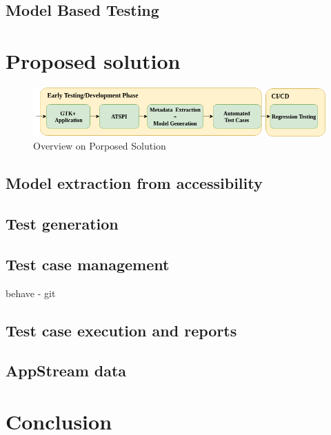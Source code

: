 \section{Model Based Testing}

\chapter{Proposed solution}

\begin{figure}[hbt]
	\centering
	\includegraphics[width=1\textwidth]{obrazky-figures/diagram.png}
	\caption{Overview on Porposed Solution}
	\label{Diagram}
\end{figure}

\section{Model extraction from accessibility}
\section{Test generation}
\section{Test case management}
behave - git
\section{Test case execution and reports}
\section{AppStream data}

\chapter{Conclusion}